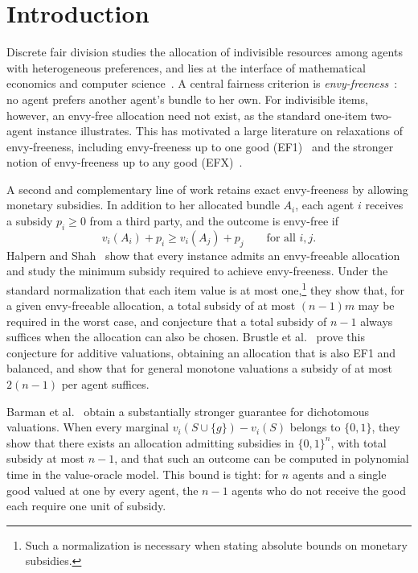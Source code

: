 \section{Introduction}
\label{sec:intro}
Discrete fair division studies the allocation of indivisible resources among agents with heterogeneous preferences, and lies at the interface of mathematical economics and computer science~\cite{BCE16,End17}. A central fairness criterion is \emph{envy-freeness}~\cite{Fol67,Var74}: no agent prefers another agent's bundle to her own. For indivisible items, however, an envy-free allocation need not exist, as the standard one-item two-agent instance illustrates. This has motivated a large literature on relaxations of envy-freeness, including envy-freeness up to one good (EF1)~\cite{Bud11,LMMS04} and the stronger notion of envy-freeness up to any good (EFX)~\cite{CKMPSW19}.

A second and complementary line of work retains exact envy-freeness by allowing monetary subsidies. In addition to her allocated bundle $A_i$, each agent $i$ receives a subsidy $p_i\geq 0$ from a third party, and the outcome is envy-free if
\[v_i(A_i)+p_i \geq v_i(A_j)+p_j
    \qquad\text{for all }i,j.\]
Halpern and Shah~\cite{HS19} show that every instance admits an envy-freeable allocation and study the minimum subsidy required to achieve envy-freeness. Under the standard normalization that each item value is at most one,\footnote{Such a normalization is necessary when stating absolute bounds on monetary subsidies.} they show that, for a given envy-freeable allocation, a total subsidy of at most $(n-1)m$ may be required in the worst case, and conjecture that a total subsidy of $n-1$ always suffices when the allocation can also be chosen. Brustle et al.~\cite{BDNSV20} prove this conjecture for additive valuations, obtaining an allocation that is also EF1 and balanced, and show that for general monotone valuations a subsidy of at most $2(n-1)$ per agent suffices.

Barman et al.~\cite{BKNS22} obtain a substantially stronger guarantee for dichotomous valuations. When every marginal $v_i(S\cup\{g\})-v_i(S)$ belongs to $\{0,1\}$, they show that there exists an allocation admitting subsidies in $\{0,1\}^n$, with total subsidy at most $n-1$, and that such an outcome can be computed in polynomial time in the value-oracle model. This bound is tight: for $n$ agents and a single good valued at one by every agent, the $n-1$ agents who do not receive the good each require one unit of subsidy.

